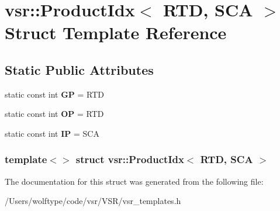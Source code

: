 \hypertarget{structvsr_1_1_product_idx_3_01_r_t_d_00_01_s_c_a_01_4}{\section{vsr\-:\-:Product\-Idx$<$ R\-T\-D, S\-C\-A $>$ Struct Template Reference}
\label{structvsr_1_1_product_idx_3_01_r_t_d_00_01_s_c_a_01_4}
}
\subsection*{Static Public Attributes}
\begin{DoxyCompactItemize}
\item 
\hypertarget{structvsr_1_1_product_idx_3_01_r_t_d_00_01_s_c_a_01_4_ad8ed4d882d452811364190088973adb2}{static const int {\bfseries G\-P} = R\-T\-D}\label{structvsr_1_1_product_idx_3_01_r_t_d_00_01_s_c_a_01_4_ad8ed4d882d452811364190088973adb2}

\item 
\hypertarget{structvsr_1_1_product_idx_3_01_r_t_d_00_01_s_c_a_01_4_affcd5bf0f50ea0a3b9ab67ca287f864a}{static const int {\bfseries O\-P} = R\-T\-D}\label{structvsr_1_1_product_idx_3_01_r_t_d_00_01_s_c_a_01_4_affcd5bf0f50ea0a3b9ab67ca287f864a}

\item 
\hypertarget{structvsr_1_1_product_idx_3_01_r_t_d_00_01_s_c_a_01_4_a28653422d4394efcb038661b47547f85}{static const int {\bfseries I\-P} = S\-C\-A}\label{structvsr_1_1_product_idx_3_01_r_t_d_00_01_s_c_a_01_4_a28653422d4394efcb038661b47547f85}

\end{DoxyCompactItemize}
\subsubsection*{template$<$$>$ struct vsr\-::\-Product\-Idx$<$ R\-T\-D, S\-C\-A $>$}



The documentation for this struct was generated from the following file\-:\begin{DoxyCompactItemize}
\item 
/\-Users/wolftype/code/vsr/\-V\-S\-R/vsr\-\_\-templates.\-h\end{DoxyCompactItemize}
